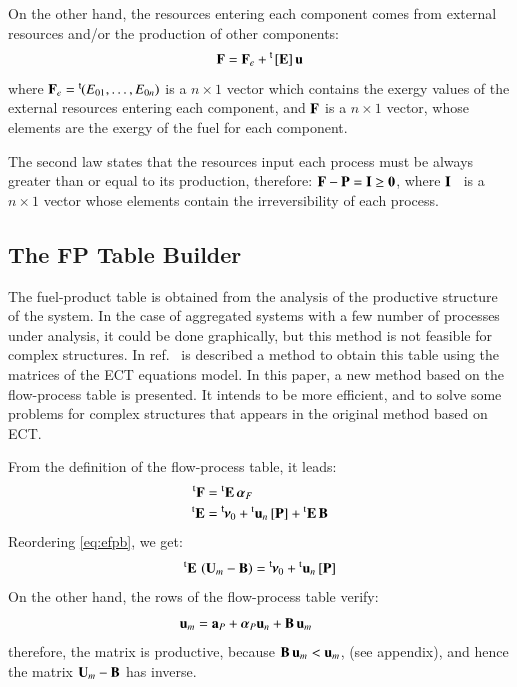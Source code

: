 \documentclass{ecos2018}
\begin{document}
On the other hand, the resources entering each component comes from external resources and/or the production of other components:
\begin{equation}
\label{eq:vmf}
\mathbf{F}=\mathbf{F}_e+\prescript{\smash{\mathsf{t}}}{}{\mskip-1mu}\left[ \textbf{E} \right]\mathbf{u}
\end{equation}
where $\mathbf{F}_e=\prescript{\smash{\mathsf{t}}}{}{\mskip-1mu}(E_{01},\ldots,E_{0n})$ is a $n \times 1$ vector which contains the exergy values of the external resources entering each component, and $\mathbf{F}$ is a $n \times 1$ vector, whose elements are the exergy of the fuel for each component. 

The second law states that the resources input each process must be always greater than or equal to its production, therefore: $\mathbf{F}-\mathbf{P}=\mathbf{I} \ge \mathbf{0}$, where $\mathbf{I}$~ is a $n \times 1$ vector whose elements contain the irreversibility of each process.

\subsection{The FP Table Builder}
The fuel-product table is obtained from the analysis of the productive structure of the system. In the case of aggregated systems with a few number of processes under analysis, it could be done graphically, but this method is not feasible for complex structures. In ref.~\cite{TAESS} is described a method to obtain this table using the matrices of the ECT equations model. In this paper, a new method based on the flow-process table is presented. It intends to be more efficient, and to solve some problems for complex structures that appears in the original method based on ECT.

From the definition of the flow-process table, it leads:
\begin{align}
\prescript{\smash{\mathrm{t}}}{}{\mathbf{F}}&=\prescript{\smash{\mathrm{t}}}{}{\mathbf{E}}\,\bm{\alpha}_F \label{eq:ffpa}\\
\prescript{\smash{\mathrm{t}}}{}{\mathbf{E}}&=\prescript{\smash{\mathsf{t}}}{}{\mskip-1mu}\bm{\nu}_0+\prescript{\smash{\mathrm{t}}}{}{\mathbf{u}}_n\,[\mathbf{P}]+\prescript{\smash{\mathrm{t}}}{}{\mathbf{E}}\,\mathbf{B}\label{eq:efpb}
\end{align}
Reordering \cref{eq:efpb}, we get: 
\begin{equation}
\prescript{\smash{\mathrm{t}}}{}{\mathbf{E}}\,\left(\mathbf{U}_m -\mathbf{B}\right) = \prescript{\smash{\mathsf{t}}}{}{\mskip-1mu}\bm{\nu}_0 +\prescript{\smash{\mathrm{t}}}{}{\mathbf{u}}_n\,[\mathbf{P}]
\label{eq:efpb1}
\end{equation}
On the other hand, the rows of the flow-process table verify:
\begin{equation}
\mathbf{u}_m=\mathbf{a}_P+\bm{\alpha}_P \mathbf{u}_n + \mathbf{B}\,\mathbf{u}_m \qquad   \label{eq:umb}
\end{equation}
therefore, the matrix  is productive, because $\mathbf{B}\,\mathbf{u}_m < \mathbf{u}_m$, (see appendix), and hence the matrix $\mathbf{U}_m - \mathbf{B}$ has inverse. 
\end{document}

